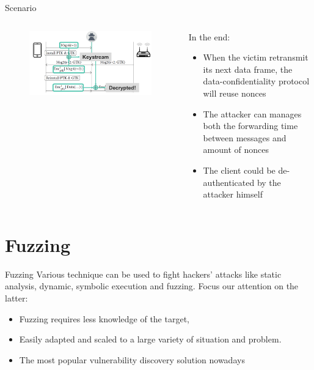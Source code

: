 \documentclass[11pt,t]{beamer}
\begin{document}
\begin{frame}[fragile]{Scenario}  
	\begin{columns}[t]
		\begin{column}{.5\textwidth}
			\begin{figure}[tbh]
				\centering
				\includegraphics[width=1.1\linewidth]{graphics/krack/k5.png}
				\label{fig:k4}
			  \end{figure}
		
		\end{column}
	
		\begin{column}{.5\textwidth}
			In the end:
			\begin{itemize}
			\item When the victim retransmit its next data frame, the data-confidentiality protocol will reuse nonces
			\item The attacker can manages both the forwarding time between messages and amount of nonces
			\item The client could be de-authenticated by the attacker himself
			\end{itemize}
		\end{column}
	\end{columns}	


\sed
\end{frame}


\section{Fuzzing}

\begin{frame}[fragile]{Fuzzing \tiny\cite{fzn}}  
Various technique can be used to fight hackers' attacks like static analysis, dynamic, symbolic execution and fuzzing.
Focus our attention on the latter:
	\begin{itemize}
		\item Fuzzing requires less knowledge of the target, 
		\item Easily adapted and scaled to a large variety of situation and problem. 
		\item The most popular vulnerability discovery solution nowadays
	\end{itemize}
\sed
\end{frame}
\end{document}
